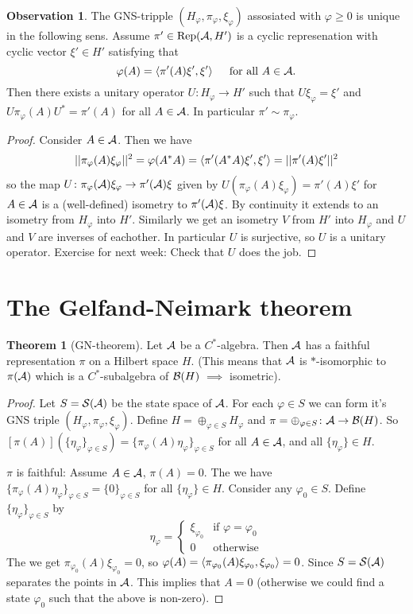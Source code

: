 \documentclass[10pt,english,a4paper]{article}
\theoremstyle{definition}
\newtheorem*{theorem}{Theorem}
\newtheorem*{observation}{Observation}
\def\pivp{\pi_{\vphi}}
\def\Hvp{H_{\vphi}}
\def\xivp{\xi_{\vphi}}
\def\etavp{\eta_{\vphi}}
\DeclareMathOperator{\Rep}{Rep}
\def\vphi{\varphi}
\begin{document}
\begin{observation}
    The GNS-tripple $(H_{\vphi}, \pi_{\vphi}, \xi_{\vphi})$ assosiated with 
$\vphi \geq 0$ is unique in the following sens. Assume $\pi' \in \Rep(\As,H')$ is 
a cyclic represenation with cyclic vector $\xi' \in H'$ satisfying that
\[ \vphi(A) = \ind{\pi'(A)\xi',\xi'} \quad \text{ for all } A \in \As.\]
Then there exists a unitary operator $U \colon H_{\vphi}\to H'$ such that  
$U\xi_{\vphi} = \xi'$ and $U\pi_{\vphi}(A)U^* = \pi'(A)$ for all $A \in \mathcal{A}$.
In particular $\pi' \sim \pi_{\vphi}$.
\end{observation}
\begin{proof}
Consider $A \in \mathcal{A}$. Then we have 
\begin{align*}
||\pi_{\vphi}(A)\xi_{\vphi}||^2 = \vphi(A^*A) = \ind{\pi'(A^*A)\xi',\xi'} 
= ||\pi'(A)\xi'||^2  
\end{align*}
so the map
$U\colon \pi_{\vphi}(\As)\xi_{\vphi} \to\pi'(\As)\xi$ given by 
$U(\pi_{\vphi}(A)\xi_{\vphi}) = \pi'(A)\xi'$ for $A \in \mathcal{A}$ is a (well-defined)
isometry to $\pi'(\mathcal{A})\xi$. By continuity it extends to an isometry from $H_{\vphi}$
into $H'$. Similarly we get an isometry $V$ from $H'$ into $H_{\vphi}$ and $U$
and $V$ are inverses of eachother. In particular $U$ is surjective, so $U$
is a unitary operator. Exercise for next week: Check that $U$ does the job. 

\end{proof}

\section*{The Gelfand-Neimark theorem}

\begin{theorem}[GN-theorem]
    Let $\mathcal{A}$ be a $C^*$-algebra. Then $\mathcal{A}$ has a faithful
representation $\pi$ on a Hilbert space $H$. 
(This means that $\mathcal{A}$ is $*$-isomorphic to $\pi(\mathcal{A})$ which is a 
$C^*$-subalgebra of $\mathcal{B}(H)$ $\implies$ isometric).
\end{theorem}
\begin{proof}
    Let $S = \mathcal{S}(\mathcal{A})$ be the state space of $\mathcal{A}$. For each $\vphi \in S$ 
we can form it's GNS triple $(\Hvp, \pivp, \xivp)$. 
Define $H = \oplus_{\vphi \in S} \Hvp$ and $\pi = \oplus_{\vphi \in S}\colon
\As\to \Bs(H)$. So $[\pi(A)](\{\etavp\}_{\vphi\in S}) = \{ \pivp(A)\etavp\}_{\vphi \in S}$
for all $A \in \mathcal{A}$, and all $\{\etavp\} \in H$.

$\pi$ is faithful: Assume $A\in \mathcal{A}$, $\pi(A) =0$. The we have 
$\{ \pivp(A)\etavp \}_{\vphi\in S} = \{0\}_{\vphi \in S}$ for all $\{\etavp\}
\in H$. Consider any $\vphi_0 \in S$. Define $\{\etavp\}_{\vphi \in S}$ by
\[ \etavp = \begin{cases} \xi_{\vphi_0} & \text{if } \vphi = \vphi_0 \\
0 & \text{otherwise} \end{cases} \]
The we get $\pi_{\vphi_0}(A) \xi_{\vphi_0} = 0$, so $\vphi(A) = \ind{\pi_{\vphi_0}(A)\xi_{\vphi_0}, \xi_{\vphi_0}}= 0$.
Since $S = \mathcal{S}(\mathcal{A})$ separates the points in $\mathcal{A}$. This implies that $A=0$ 
(otherwise we could find a state $\vphi_0$ such that the above is non-zero).
\end{proof}
\end{document}
